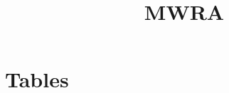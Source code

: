 \documentclass[twoside,openright,cleardoubleempty,10pt,DIV14]{scrartcl}
\begin{document}
\setcounter{page}{01}

\title{MWRA}
\author{}
\date{}
\maketitle

\section{Tables}

\providecommand\oursolver{OptSearch}

\scriptsize






  
\end{document}
